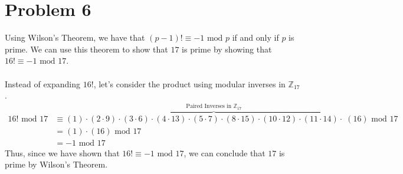 \documentclass[8pt]{extarticle}
\begin{document}
\pagebreak
\section*{Problem 6}
Using Wilson's Theorem, we have that $(p-1)! \equiv -1 \text{ mod }p$ if and only if $p$ is prime. We can use this theorem to show that $17$ is prime by showing that $16! \equiv -1 \text{ mod }17$.\\
\\
Instead of expanding $16!$, let's consider the product using modular inverses in $\mathbb{Z}_{17}$.
\begin{align*}
16! \text{ mod }17 &\equiv (1) \cdot \overbrace{(2 \cdot 9) \cdot (3 \cdot 6) \cdot (4 \cdot 13) \cdot (5 \cdot 7) \cdot (8 \cdot 15) \cdot (10 \cdot 12) \cdot (11 \cdot 14)}^{\text{Paired Inverses in }\mathbb{Z}_{17}} \cdot\; (16) \text{ mod }17\\
    &= (1) \cdot (16) \text{ mod }17\\
    &= -1 \text{ mod }17
\end{align*}
Thus, since we have shown that $16! \equiv -1 \text{ mod }17$, we can conclude that $17$ is prime by Wilson's Theorem.

\pagebreak
\end{document}
